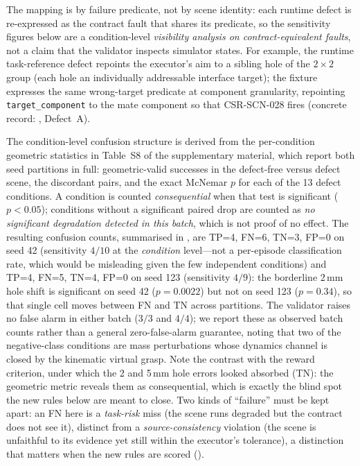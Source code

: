 The mapping is by failure predicate, not by scene identity: each runtime
defect is re-expressed as the contract fault that shares its predicate, so
the sensitivity figures below are a condition-level \emph{visibility
analysis on contract-equivalent faults}, not a claim that the validator
inspects simulator states. For example, the runtime task-reference defect
repoints the executor's aim to a sibling hole of the $2\times2$ group (each
hole an individually addressable interface target); the fixture expresses
the same wrong-target predicate at component granularity, repointing
\texttt{target\_component} to the mate component so that CSR-SCN-028 fires
(concrete record: , Defect~A).

The condition-level confusion structure is derived from the per-condition
geometric statistics in Table~S8 of the supplementary material, which report both
seed partitions in full: geometric-valid successes in the defect-free versus
defect scene, the discordant pairs, and the exact McNemar $p$ for each of
the 13 defect conditions. A condition is counted \emph{consequential} when
that test is significant ($p<0.05$); conditions without a significant
paired drop are counted as \emph{no significant degradation detected in this
batch}, which is not proof of no effect. The resulting confusion counts,
summarised in , are TP=4, FN=6, TN=3, FP=0 on
seed 42 (sensitivity $4/10$ at the \emph{condition} level---not a
per-episode classification rate, which would be misleading given the few
independent conditions) and TP=4, FN=5, TN=4, FP=0 on seed 123 (sensitivity
$4/9$): the borderline 2\,mm hole shift is significant on seed 42
($p=0.0022$) but not on seed 123 ($p=0.34$), so that single cell moves
between FN and TN across partitions. The validator raises no false alarm in
either batch ($3/3$ and $4/4$); we report these as observed batch counts
rather than a general zero-false-alarm guarantee, noting that two of the
negative-class conditions are mass perturbations whose dynamics channel is
closed by the kinematic virtual grasp. Note the contrast with the reward
criterion, under which the 2 and 5\,mm hole errors looked absorbed (TN): the
geometric metric reveals them as consequential, which is exactly the blind
spot the new rules below are meant to close. Two kinds of ``failure'' must
be kept apart: an FN here is a \emph{task-risk} miss (the scene runs
degraded but the contract does not see it), distinct from a
\emph{source-consistency} violation (the scene is unfaithful to its evidence
yet still within the executor's tolerance), a distinction that matters when
the new rules are scored ().


